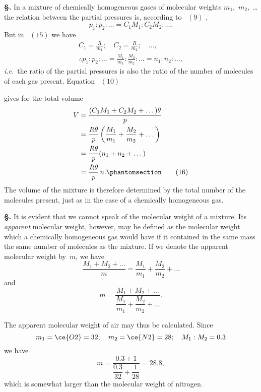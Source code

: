 \documentclass[12pt]{book}[2005/09/16]
\newcommand{\Chg}[2]{#2}
\newcommand{\Add}[1]{\Chg{}{#1}}
\newcommand{\Section}[1]{
  \medskip\par\textbf{§\;#1}
  \label{section:#1}
}
\newcommand{\Tag}[1]{%
  \phantomsection\label{eqn:#1}\tag*{\ensuremath{#1}}%
}
\newcommand{\Eq}[1]{%
  \hyperref[eqn:#1]{\ensuremath{#1}}%
}
\newcommand{\PageSep}[1]{\ignorespaces}
\newcommand{\ie}{\emph{i.e.}}
\begin{document}
\Section{40.} In a mixture of chemically homogeneous gases of
%
\PageSep{28}
%
molecular weights $m_{1}$,~$m_{2}$,~\dots the relation between the
partial pressures is, according to~\Eq{(9)},
\[
p_{1} : p_{2} : \dots = C_{1}M_{1} : C_{2}M_{2} \Add{:} \dots\Add{.}
\]
But in~\Eq{(15)} we have
\begin{gather*}
C_{1} = \frac{R}{m_{1}};\quad
C_{2} = \frac{R}{m_{2}};\quad \dots\Add{,} \\
\therefore
p_{1} : p_{2} : \dots = \frac{M_{1}}{m_{1}} : \frac{M_{2}}{m_{2}} : \dots
  = n_{1} : n_{2} : \dots\Add{,}
\end{gather*}
\ie\ the ratio of the partial pressures is also the ratio of the
number of molecules of each gas present. Equation~\Eq{(10)}
gives for the total volume
\begin{align*}
V &= \frac{(C_{1}M_{1} + C_{2}M_{2} + \dots)\theta}{p} \\
  &= \frac{R\theta}{p} \left(\frac{M_{1}}{m_{1}} + \frac{M_{2}}{m_{2}} + \dots\right) \\
  &= \frac{R\theta}{p} (n_{1} + n_{2} + \dots) \\
  &= \frac{R\theta}{p}\, n\Add{.}
\Tag{(16)}
\end{align*}
The volume of the mixture is therefore determined by
the total number of the molecules present, just as in the
case of a chemically homogeneous gas.

\Section{41.} It is evident that we cannot speak of the molecular
weight of a mixture. Its \emph{apparent} molecular weight, however,
%
may be defined as the molecular weight which a
chemically homogeneous gas would have if it contained in
the same mass the same number of molecules as the
mixture. If we denote the apparent molecular weight by~$m$,
we have
\[
\frac{M_{1} + M_{2} + \dots}{m}
  = \frac{M_{1}}{m_{1}} + \frac{M_{2}}{m_{2}} + \dots
\]
and
\[
m = \frac{M_{1} + M_{2} + \dots}{\dfrac{M_{1}}{m_{1}} + \dfrac{M_{2}}{m_{2}} + \dots}\Add{.}
\]
\PageSep{29}

The apparent molecular weight of air may thus be calculated.
Since
\[
m_{1} = \ce{O2} = 32;\quad
m_{2} = \ce{N2} = 28;\quad
M_{1} : M_{2} = 0.3
\]
we have
\[
m = \frac{0.3 + 1}{\dfrac{0.3}{32} + \dfrac{1}{28}} = 28.8,
\]
which is somewhat larger than the molecular weight of
nitrogen.
\end{document}
